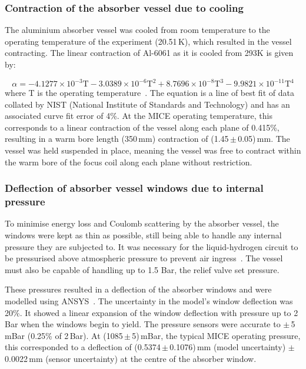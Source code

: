 \subsubsection{Contraction of the absorber vessel due to cooling}
\label{SubSect:Absorber_Contraction}

The aluminium absorber vessel was cooled from room temperature to the operating temperature of the
experiment (20.51\,K), which resulted in the vessel contracting. The linear contraction of
Al-6061 as it is cooled from 293K is given by:

\begin{equation}
  \alpha =-4.1277\times {10}^{-3}\mathrm{T}-3.0389\times {10}^{-6}\mathrm{T}^2+8.7696\times {10}^{-8}\mathrm{T}^3-9.9821\times {10}^{-11}\mathrm{T}^4
\end{equation}
where T is the operating temperature~\cite{Hardin}. The equation is a line of best fit of data collated by NIST
(National Institute of Standards and Technology) and has an associated curve fit error of 4\%.
At the MICE operating temperature, this corresponds to a linear contraction of the vessel along each plane of 0.415\%,
resulting in a warm bore length (350\,mm) contraction of (1.45\,$\mathrm{\pm}$\,0.05)\,mm. The vessel was held suspended in place, meaning the vessel was free to contract within the warm bore of the focus coil along each plane without restriction.

\subsubsection{Deflection of absorber vessel windows due to internal pressure}
\label{SubSect:Absorber_pressure}

To minimise energy loss and Coulomb scattering by the absorber vessel, the windows were kept as thin as
possible, still being able to handle any internal pressure they are subjected to.
It was necessary for the liquid-hydrogen circuit to be pressurised above atmospheric pressure to prevent air ingress~\cite{1748-0221-13-09-T09008}\cite{Ishimoto}.
The vessel must also be capable of handling up to 1.5 Bar, the relief valve set pressure.

These pressures resulted in a deflection of the absorber windows and were modelled using
ANSYS~\cite{NOTE155}. The uncertainty in the model's window deflection was 20\%. It showed a linear
expansion of the window deflection with pressure up to 2 Bar when the windows begin to yield.
The pressure sensors were accurate to $\mathrm{\pm}$\,5\,mBar (0.25\% of 2\,Bar). At (1085\,$\mathrm{\pm}$\,5)\,mBar, the typical MICE operating pressure, this corresponded to a deflection of (0.5374\,$\mathrm{\pm}$\,0.1076)\,mm (model uncertainty) $\mathrm{\pm}$\,0.0022\,mm (sensor uncertainty) at the centre of
the absorber window.


